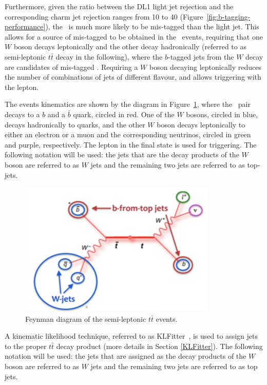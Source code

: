 Furthermore, given the ratio between the DL1 light jet rejection and the corresponding charm jet rejection 
ranges from 10 to 40 (Figure~\ref{fig:b-tagging-performance}), the 
\cjet\ is much more likely to be mis-tagged than the light jet. 
This allows for a source of mis-tagged \cjets to be obtained in the \ttbar\ events, 
requiring that one $W$ boson decays leptonically and the other decay hadronically 
(referred to as semi-leptonic $t\bar{t}$ decay in the following),
where the $b$-tagged jets from the $W$ decay are candidates of mis-tagged \cjets.
Requiring a $W$ boson decaying leptonically 
reduces the number of combinations of jets of different flavour, 
and allows triggering with the lepton.

The events kinematics are shown by the diagram in 
Figure~\ref{fig:feynman}, where the \ttbar\ pair decays to a 
$b$ and a $\bar{b}$ quark, circled in red. One of the $W$ bosons, 
circled in blue, decays hadronically to quarks, 
and the other $W$ boson decays leptonically to either 
an electron or a muon and the corresponding neutrinos, 
circled in green and purple, respectively. 
The lepton in the final state is used for triggering.
The following notation will be used: the jets that are
the decay products of the $W$ boson are referred to as
$W$ jets and the remaining two jets are referred to as top-jets.

\begin{figure}[H]
\centering
\includegraphics[width=.45\textwidth]{FTAG_plots/feynman.png}
\caption{Feynman diagram of the semi-leptonic $t\bar{t}$ events.}
\label{fig:feynman}
\end{figure}


A kinematic likelihood technique, referred to as 
KLFitter~\cite{ERDMANN201418}, is used to assign jets to the proper $t\bar{t}$ decay product 
(more details in Section \ref{KLFitter}). 
The following notation will be used: the jets that are
assigned as the decay products of the $W$ boson are referred to as
$W$ jets and the remaining two jets are referred to as top jets.


